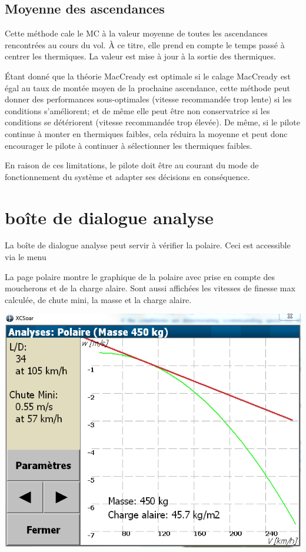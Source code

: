 \subsection*{Moyenne des ascendances}

Cette méthode cale le MC à la valeur moyenne de toutes les ascendances rencontrées au cours du vol. À ce titre, elle prend en compte le temps passé à centrer les thermiques. La valeur est mise à jour à la sortie des thermiques.

Étant donné que la théorie MacCready est optimale si le calage MacCready est égal au taux de montée moyen de la prochaine ascendance, cette méthode peut donner des performances sous-optimales (vitesse recommandée trop lente) si les conditions s'améliorent; et de même elle peut être non conservatrice si les conditions se détériorent (vitesse recommandée trop élevée).  De même, si le pilote continue à monter en thermiques faibles, cela réduira la moyenne et peut donc encourager le pilote à continuer à sélectionner les thermiques faibles.

En raison de ces limitations, le pilote doit être au courant du mode de fonctionnement du système et adapter ses décisions en conséquence.

\section{boîte de dialogue analyse}

La boîte de dialogue analyse peut servir à vérifier la polaire.  Ceci est accessible via le menu
\begin{quote}
\blink{}
\end{quote}

La page polaire montre le graphique de la polaire avec prise en compte des moucherons et de la charge alaire. Sont aussi affichées les vitesses de finesse max calculée, de chute mini, la masse et la charge alaire.

\begin{center}
\includegraphics[angle=0,width=0.8\linewidth,keepaspectratio='true']{figures/analysis-glidepolar.png}
\end{center}

